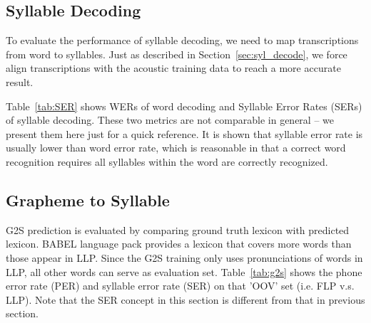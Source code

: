 \documentclass[journal]{IEEEtran}
\begin{document}
\subsection{Syllable Decoding}
To evaluate the performance of syllable decoding, we need to map transcriptions from word to syllables. Just as 
described in Section~\ref{sec:syl_decode}, we force align transcriptions with the acoustic training data to reach a 
more accurate result.

Table~\ref{tab:SER} shows WERs of word decoding and Syllable Error Rates (SERs) of syllable decoding. 
These two metrics are not comparable in general -- we present them here just for a quick reference. It is
shown that syllable error rate is usually lower than word error rate, which is reasonable in that
a correct word recognition requires all syllables within the word are correctly recognized.

\subsection{Grapheme to Syllable}
G2S prediction is evaluated by comparing ground truth lexicon with predicted lexicon. BABEL language 
pack provides a lexicon that covers more words than those appear in LLP. Since the G2S training only 
uses pronunciations of words in LLP, all other words can serve as evaluation set. Table~\ref{tab:g2s} 
shows the phone error rate (PER) and syllable error rate (SER) on that 'OOV' set (i.e. FLP v.s. LLP). Note 
that the SER concept in this section is different from that in previous section.
\end{document}
